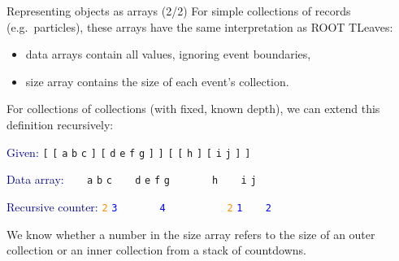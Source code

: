 \documentclass{beamer}
\begin{document}
\begin{frame}{Representing objects as arrays (2/2)}
\vspace{0.3 cm}
For simple collections of records (e.g.\ particles), these arrays have the same interpretation as ROOT TLeaves:
\begin{itemize}
\item data arrays contain all values, ignoring event boundaries,
\item size array contains the size of each event's collection.
\end{itemize}

\vfill
For collections of collections (with fixed, known depth), we can extend this definition recursively:

\vspace{0.3 cm}
\textcolor{darkblue}{Given:} \hfill {\tt [} {\tt [} {\tt a} {\tt b} {\tt c} {\tt ]} {\tt [} {\tt d} {\tt e} {\tt f} {\tt g} {\tt ]} {\tt ]} {\tt [} {\tt [} {\tt h} {\tt ]} {\tt [} {\tt i} {\tt j} {\tt ]} {\tt ]}

\textcolor{darkblue}{Data array:} \hfill {\tt \ } {\tt \ } {\tt a} {\tt b} {\tt c} {\tt \ } {\tt \ } {\tt d} {\tt e} {\tt f} {\tt g} {\tt \ } {\tt \ } {\tt \ } {\tt \ } {\tt h} {\tt \ } {\tt \ } {\tt i} {\tt j} {\tt \ } {\tt \ }

\textcolor{darkblue}{Recursive counter:} \hfill \textcolor{darkorange}{\tt 2} \textcolor{blue}{\tt 3} {\tt \ } {\tt \ } {\tt \ } {\tt \ } \textcolor{blue}{\tt 4} {\tt \ } {\tt \ } {\tt \ } {\tt \ } {\tt \ } {\tt \ } \textcolor{darkorange}{\tt 2} \textcolor{blue}{\tt 1} {\tt \ } {\tt \ } \textcolor{blue}{\tt 2} {\tt \ } {\tt \ } {\tt \ } {\tt \ }

\vspace{0.3 cm}
We know whether a number in the size array refers to the size of an outer collection or an inner collection from a stack of countdowns.
\end{frame}
\end{document}

